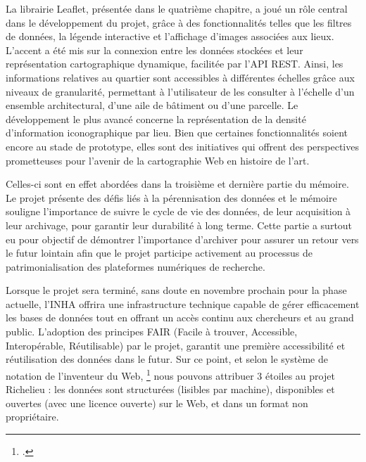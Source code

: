 La librairie Leaflet, présentée dans le quatrième chapitre, a joué un rôle central dans le développement du projet, grâce à des fonctionnalités telles que les filtres de données, la légende interactive et l'affichage d'images associées aux lieux. L'accent a été mis sur la connexion entre les données stockées et leur représentation cartographique dynamique, facilitée par l'API REST. Ainsi, les informations relatives au quartier sont accessibles à différentes échelles grâce aux niveaux de granularité, permettant à l'utilisateur de les consulter à l'échelle d'un ensemble architectural, d'une aile de bâtiment ou d’une parcelle. Le développement le plus avancé concerne la représentation de la densité d'information iconographique par lieu. Bien que certaines fonctionnalités soient encore au stade de prototype, elles sont des initiatives qui offrent des perspectives prometteuses pour l'avenir de la cartographie Web en histoire de l'art.

Celles-ci sont en effet abordées dans la troisième et dernière partie du mémoire. Le projet présente des défis liés à la pérennisation des données et le mémoire souligne l’importance de suivre le cycle de vie des données, de leur acquisition à leur archivage, pour garantir leur durabilité à long terme. Cette partie a surtout eu pour objectif de démontrer l'importance d'archiver pour assurer un retour vers le futur lointain afin que le projet participe activement au processus de patrimonialisation des plateformes numériques de recherche. 

Lorsque le projet sera terminé, sans doute en novembre prochain pour la phase actuelle, l'INHA offrira  une infrastructure technique capable de gérer efficacement les bases de données tout en offrant un accès continu aux chercheurs et au grand public. L'adoption des principes FAIR (Facile à trouver, Accessible, Interopérable, Réutilisable) par le projet,  garantit une première accessibilité et réutilisation des données dans le futur. Sur ce point, et selon le système de notation de l'inventeur du Web, \footcite{BERNERS-LEELinked2009} nous pouvons attribuer 3 étoiles au projet Richelieu : les données sont structurées (lisibles par machine), disponibles et ouvertes (avec une licence ouverte) sur le Web, et dans un format non propriétaire. 

